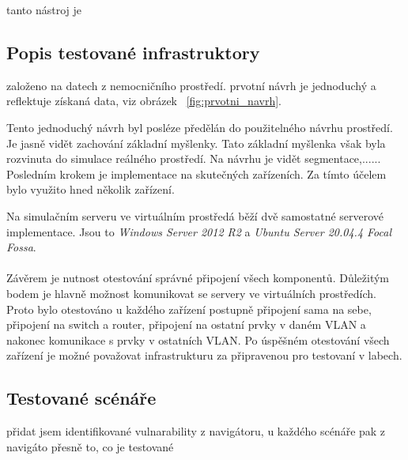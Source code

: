 tanto nástroj je


\subsection{Popis testované infrastruktory}

založeno na datech z nemocničního prostředí.
prvotní návrh je jednoduchý a reflektuje získaná data, viz obrázek ~\ref{fig:prvotni_navrh}.

Tento jednoduchý návrh byl posléze předělán do použitelného návrhu prostředí.
Je jasně vidět zachování základní myšlenky.
Tato základní myšlenka však byla rozvinuta do simulace reálného prostředí.
Na návrhu je vidět segmentace,......
Posledním krokem je implementace na skutečných zařízeních.
Za tímto účelem bylo využito hned několik zařízení.

Na simulačním serveru ve virtuálním prostředá běží dvě samostatné serverové implementace.
Jsou to \textit{Windows Server 2012 R2} a \textit{Ubuntu Server 20.04.4 Focal Fossa}.

\paragraph{}
Závěrem je nutnost otestování správné připojení všech komponentů.
Důležitým bodem je hlavně možnost komunikovat se servery ve virtuálních prostředích.
Proto bylo otestováno u každého zařízení postupně připojení sama na sebe, připojení na switch a router, připojení na ostatní prvky v daném VLAN a nakonec komunikace s prvky v ostatních VLAN\@.
Po úspěšném otestování všech zařízení je možné považovat  infrastrukturu za připravenou pro testovaní v labech.

\subsection{Testované scénáře}


přidat jsem identifikované vulnarability z navigátoru, u každého scénáře pak z navigáto přesně to, co je testované

